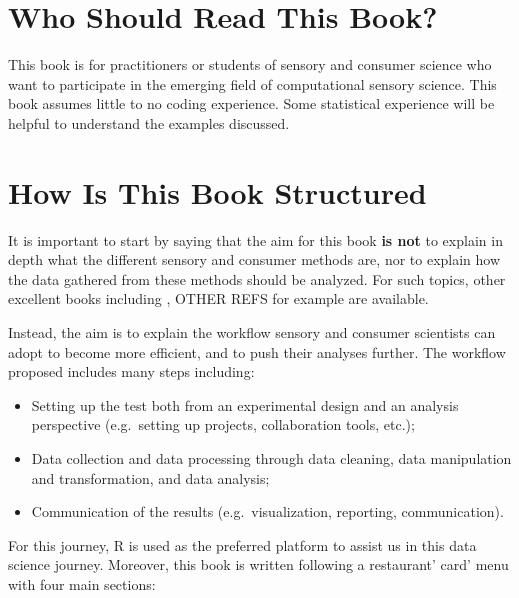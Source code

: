 \documentclass[
]{krantz}
\providecommand{\tightlist}{%
  \setlength{\itemsep}{0pt}\setlength{\parskip}{0pt}}
\begin{document}
\hypertarget{who-should-read-this-book}{%
\section*{Who Should Read This Book?}\label{who-should-read-this-book}}


This book is for practitioners or students of sensory and consumer science who want to participate in the emerging field of computational sensory science. This book assumes little to no coding experience. Some statistical experience will be helpful to understand the examples discussed.

\hypertarget{how-is-this-book-structured}{%
\section*{How Is This Book Structured}\label{how-is-this-book-structured}}


It is important to start by saying that the aim for this book \textbf{is not} to explain in depth what the different sensory and consumer methods are, nor to explain how the data gathered from these methods should be analyzed. For such topics, other excellent books including \citet{Le2018}, OTHER REFS for example are available.

Instead, the aim is to explain the workflow sensory and consumer scientists can adopt to become more efficient, and to push their analyses further. The workflow proposed includes many steps including:

\begin{itemize}
\tightlist
\item
  Setting up the test both from an experimental design and an analysis perspective (e.g.~setting up projects, collaboration tools, etc.);
\item
  Data collection and data processing through data cleaning, data manipulation and transformation, and data analysis;
\item
  Communication of the results (e.g.~visualization, reporting, communication).
\end{itemize}

For this journey, R is used as the preferred platform to assist us in this data science journey. Moreover, this book is written following a restaurant' card' menu with four main sections:
\end{document}
